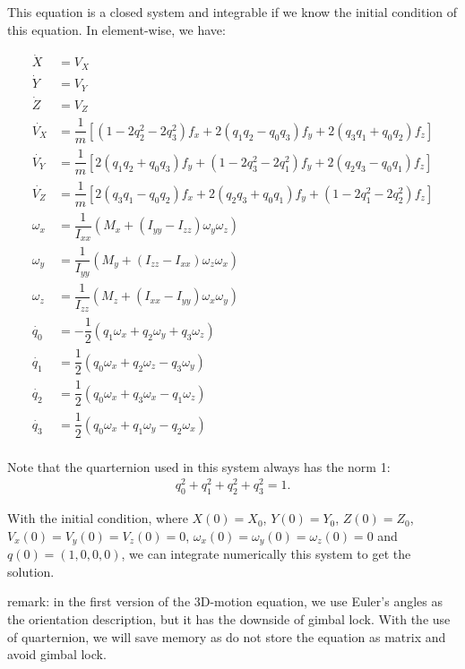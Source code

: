 \documentclass[12pt, a4paper]{article}
\begin{document}
This equation is a closed system and integrable if we know the initial condition of this equation. In element-wise, we have:

\begin{equation}
	\begin{aligned}
		\dot{X} & = V_X \\
		\dot{Y} & = V_Y \\
		\dot{Z} & = V_Z \\
		\dot{V_X} & = \dfrac{1}{m} \left[ (1 - 2 q_2^2 - 2 q_3^2) f_x + 2(q_1 q_2 - q_0 q_3) f_y + 2(q_3 q_1 + q_0 q_2) f_z \right] \\
		\dot{V_Y} & = \dfrac{1}{m} \left[ 2(q_1 q_2 + q_0 q_3) f_y + (1 - 2 q_3^2 - 2 q_1^2) f_y + 2(q_2 q_3 - q_0 q_1) f_z \right] \\
		\dot{V_Z} & = \dfrac{1}{m} \left[ 2(q_3 q_1 - q_0 q_2) f_x + 2(q_2 q_3 + q_0 q_1) f_y + (1 - 2 q_1^2 - 2 q_2^2) f_z \right] \\
		\omega_x & = \dfrac{1}{I_{xx}} \left( M_x + (I_{yy} - I_{zz}) \omega_y \omega_z \right) \\
		\omega_y & = \dfrac{1}{I_{yy}} \left( M_y + (I_{zz} - I_{xx}) \omega_z \omega_x \right) \\
		\omega_z & = \dfrac{1}{I_{zz}} \left( M_z + (I_{xx} - I_{yy}) \omega_x \omega_y \right) \\
		\dot{q_0} & = - \dfrac{1}{2} \left( q_1 \omega_x + q_2 \omega_y + q_3 \omega_z \right) \\
		\dot{q_1} & = \dfrac{1}{2} \left( q_0 \omega_x + q_2 \omega_z - q_3 \omega_y \right) \\
		\dot{q_2} & = \dfrac{1}{2} \left( q_0 \omega_x + q_3 \omega_x - q_1 \omega_z \right) \\
		\dot{q_3} & = \dfrac{1}{2} \left( q_0 \omega_x + q_1 \omega_y - q_2 \omega_x \right) \\
	\end{aligned}
\end{equation}

Note that the quarternion used in this system always has the norm 1:
\begin{align}
	q_0^2 + q_1^2 + q_2^2 + q_3^2 = 1.
\end{align}

With the initial condition, where $X(0) = X_0$, $Y(0) = Y_0$, $Z(0) = Z_0$, $V_x(0) = V_y(0) = V_z(0) = 0$, $\omega_x(0) = \omega_y(0) = \omega_z(0) = 0$ and $q(0) = (1, 0, 0, 0)$, we can integrate numerically this system to get the solution.

remark: in the first version of the 3D-motion equation, we use Euler's angles as the orientation description, but it has the downside of gimbal lock. With the use of quarternion, we will save memory as do not store the equation as matrix and avoid gimbal lock.
\end{document}
